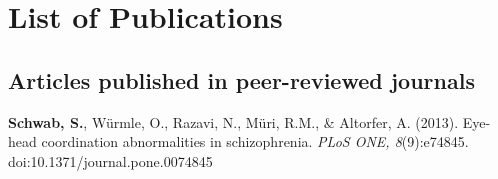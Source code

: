\chapter*{List of Publications}

\section*{Articles published in peer-reviewed journals}
\sffamily

\textbf{Schwab, S.}, Würmle, O., Razavi, N., Müri, R.M., \& Altorfer, A. (2013). Eye-head coordination abnormalities in schizophrenia. \textit{PLoS ONE, 8}(9):e74845. doi:10.1371/journal.pone.0074845
